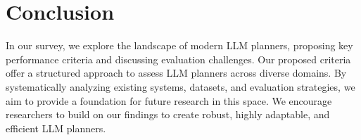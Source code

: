 \section{Conclusion}
\label{sec:conclusion}

In our survey, we explore the landscape of modern LLM planners, proposing key performance criteria and discussing evaluation challenges. Our proposed criteria offer a structured approach to assess LLM planners across diverse domains. By systematically analyzing existing systems, datasets, and evaluation strategies, we aim to provide a foundation for future research in this space. We encourage researchers to build on our findings to create robust, highly adaptable, and efficient LLM planners.
